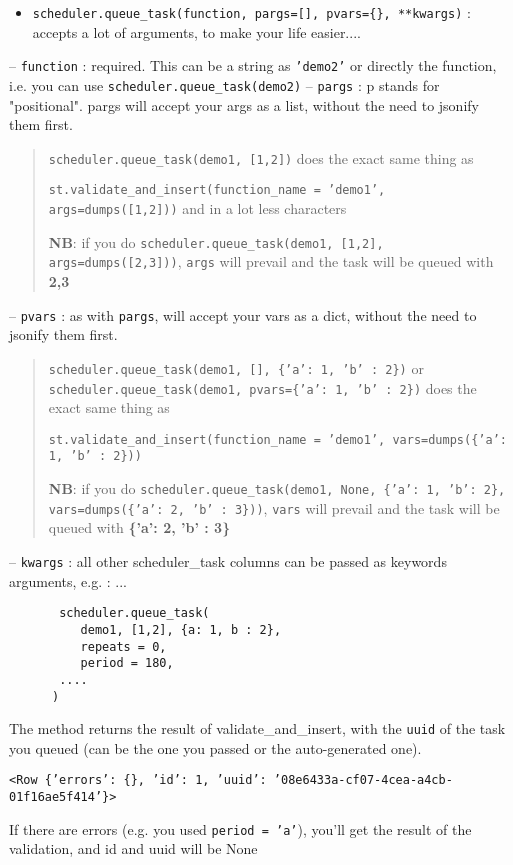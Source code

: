 \documentclass[justified,sixbynine,notoc]{tufte-book}
\def\ft{\small\tt}
\begin{document}
\begin{fullwidth}
\begin{itemize}
\item {\ft scheduler.queue\_task(function, pargs=[], pvars=\{\}, **kwargs)} : accepts a lot of arguments, to make your life easier....
\end{itemize}
-- {\ft function} : required. This can be a string as {\ft 'demo2'} or directly the function, i.e. you can use {\ft scheduler.queue\_task(demo2)}
-- {\ft pargs} : p stands for "positional". pargs will accept your args as a list, without the need to jsonify them first.
\begin{quote}{\ft scheduler.queue\_task(demo1, [1,2])}
\noindent does the exact same thing as

{\ft st.validate\_and\_insert(function\_name = 'demo1', args=dumps([1,2]))}
\noindent and in a lot less characters

{\bf NB}: if you do {\ft scheduler.queue\_task(demo1, [1,2], args=dumps([2,3]))}, {\ft args} will prevail and the task will be queued with {\bf 2,3}\end{quote}-- {\ft pvars} : as with {\ft pargs}, will accept your vars as a dict, without the need to jsonify them first.
\begin{quote}{\ft scheduler.queue\_task(demo1, [], \{'a': 1, 'b' : 2\})} or {\ft scheduler.queue\_task(demo1, pvars=\{'a': 1, 'b' : 2\})}
\noindent does the exact same thing as

{\ft st.validate\_and\_insert(function\_name = 'demo1', vars=dumps(\{'a': 1, 'b' : 2\}))}

{\bf NB}:  if you do {\ft scheduler.queue\_task(demo1, None, \{'a': 1, 'b': 2\}, vars=dumps(\{'a': 2, 'b' : 3\}))}, {\ft vars} will prevail and the task will be queued with {\bf \{'a': 2, 'b' : 3\}}\end{quote}-- {\ft kwargs} : all other scheduler\_task columns can be passed as keywords arguments, e.g. :
... \begin{lstlisting}
       scheduler.queue_task(
          demo1, [1,2], {a: 1, b : 2},
          repeats = 0,
          period = 180,
       ....
      )
\end{lstlisting}

The method returns the result of validate\_and\_insert, with the {\ft uuid} of the task you queued (can be the one you passed or the auto-generated one).

{\ft <Row \{'errors': \{\}, 'id': 1, 'uuid': '08e6433a-cf07-4cea-a4cb-01f16ae5f414'\}>}

If there are errors (e.g. you used {\ft period = 'a'}), you'll get the result of the validation, and id and uuid will be None


\end{fullwidth}
\end{document}
